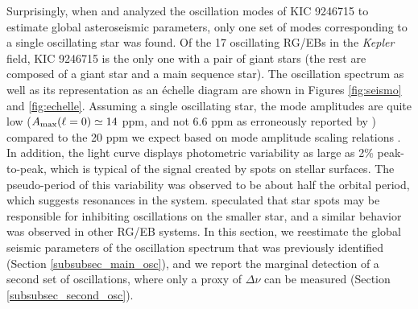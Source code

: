 Surprisingly, when \citet{gau13} and \citet{gau14} analyzed the oscillation modes of KIC 9246715 to estimate global asteroseismic parameters, only one set of modes corresponding to a single oscillating star was found. Of the 17 oscillating RG/EBs in the \emph{Kepler} field, KIC 9246715 is the only one with a pair of giant stars (the rest are composed of a giant star and a main sequence star). The oscillation spectrum as well as its representation as an \'echelle diagram are shown in Figures \ref{fig:seismo} and \ref{fig:echelle}. Assuming a single oscillating star, the mode amplitudes are quite low ($A_{\rm{max}}(\ell=0) \simeq 14$ ppm, and not 6.6 ppm as erroneously reported by \citealt{gau14}) compared to the 20 ppm we expect based on mode amplitude scaling relations \citep{cor13}. In addition, the light curve displays photometric variability as large as 2\% peak-to-peak, which is typical of the signal created by spots on stellar surfaces. The pseudo-period of this variability was observed to be about half the orbital period, which suggests resonances in the system. \citet{gau14} speculated that star spots may be responsible for inhibiting oscillations on the smaller star, and a similar behavior was observed in other RG/EB systems. In this section, we reestimate the global seismic parameters of the oscillation spectrum that was previously identified (Section \ref{subsubsec_main_osc}), and we report the marginal detection of a second set of oscillations, where only a proxy of $\Delta\nu$ can be measured (Section \ref{subsubsec_second_osc}).


